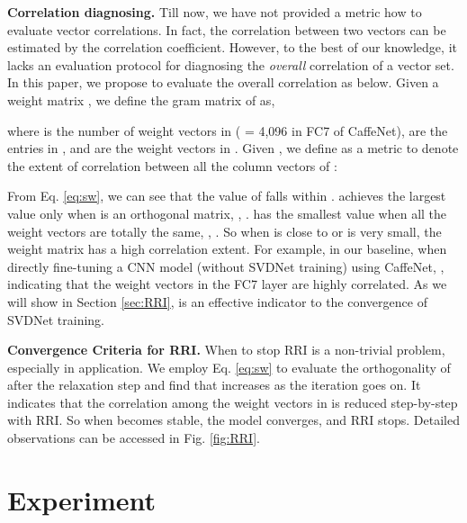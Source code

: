 \documentclass[10pt,twocolumn,letterpaper]{article}
\begin{document}
\textbf{Correlation diagnosing.} Till now, we have not provided a metric how to evaluate vector correlations.  In fact, the correlation between two vectors can be estimated by the correlation coefficient. However, to the best of our knowledge, it lacks an evaluation protocol for diagnosing the \emph{overall} correlation of a vector set. In this paper, we propose to evaluate the overall correlation as below. Given a weight matrix , we define the gram matrix of  as,
    
where  is the number of weight vectors in  ( = 4,096 in FC7 of CaffeNet),  are the entries in , and  are the weight vectors in . Given , we define   as a metric to denote the extent of correlation between all the column vectors of : 

From Eq. \ref{eq:sw}, we can see that the value of  falls within .  achieves the largest value  only when  is an orthogonal matrix, \ie, .  has the smallest value  when all the weight vectors are totally the same, \ie, . So when  is close to  or is very small, the weight matrix has a high correlation extent. For example, in our baseline, when directly fine-tuning a CNN model (without SVDNet training) using CaffeNet, , indicating that the weight vectors in the FC7 layer are highly correlated. As we will show in Section \ref{sec:RRI},  is an effective indicator to the convergence of SVDNet training.

\textbf{Convergence Criteria for RRI.}
When to stop RRI is a non-trivial problem, especially in application. We employ Eq. \ref{eq:sw} to evaluate the orthogonality of  after the relaxation step and find that  increases as the iteration goes on. It indicates that the correlation among the weight vectors in  is reduced step-by-step with RRI. So when  becomes stable, the model converges, and RRI stops. Detailed observations can be accessed in Fig. \ref{fig:RRI}.


\section{Experiment}
\end{document}
